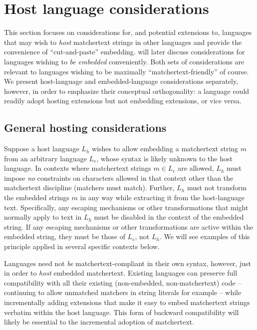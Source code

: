 \section{Host language considerations}
\label{sec:host}

This section focuses on considerations for,
and potential extensions to,
languages that may wish to \emph{host}
matchertext strings in other languages
and provide the convenience of ``cut-and-paste'' embedding.
 will later discuss considerations
for languages wishing to \emph{be embedded} conveniently.
Both sets of considerations are relevant
to languages wishing to be maximally ``matchertext-friendly'' of course.
We present host-language and embedded-language considerations separately,
however,
in order to emphasize their conceptual orthogonality:
a language could readily adopt hosting extensions but not embedding extensions,
or vice versa.


\subsection{General hosting considerations}

Suppose a host language $L_h$ wishes
to allow embedding a matchertext string $m$
from an arbitrary language $L_e$,
whose syntax is likely unknown to the host language.
In contexts where matchertext strings $m \in L_e$ are allowed,
$L_h$ must impose \emph{no} constraints on characters allowed in that context
other than the matchertext discipline (matchers must match).
Further, $L_h$ must not transform the embedded strings $m$ in any way
while extracting it from the host-language text.
Specifically, any escaping mechanisms or other transformations
that might normally apply to text in $L_h$
must be disabled in the context of the embedded string.
If any escaping mechanisms or other transformations
are active within the embedded string,
they must be those of $L_e$, not $L_h$.
We will see examples of this principle applied
in several specific contexts below.

Languages need not \emph{be} matchertext-compliant in their own syntax,
however,
just in order to \emph{host} embedded matchertext.
Existing languages can preserve full compatibility
with all their existing (non-embedded, non-matchertext) code --
continuing to allow unmatched matchers in string literals for example --
while incrementally adding extensions that make it easy
to embed matchertext strings verbatim within the host language.
This form of backward compatibility will likely be essential
to the incremental adoption of matchertext.

